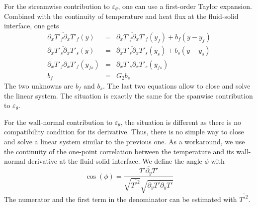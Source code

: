 \documentclass{svjour3}                     %
\begin{document}
For the streamwise contribution to $\varepsilon_\theta$, one can use a first-order Taylor expansion.
Combined with the continuity of temperature and heat flux at the fluid-solid interface, one gets
\begin{eqnarray}
\overline{\partial_x T'_f \partial_x T'_f} \left( y \right) & = & \overline{\partial_x T'_f \partial_x T'_f} \left( y_f \right) + b_f \left( y-y_f \right) \nonumber \\
\overline{\partial_x T'_s \partial_x T'_s} \left( y \right) & = & \overline{\partial_x  T'_s \partial_x T'_s} \left( y_s \right) + b_s \left( y-y_s \right) \nonumber \\
\overline{\partial_x T'_f \partial_x T'_f} \left( y_{fs} \right) & = & \overline{\partial_x T'_s \partial_x T'_s} \left( y_{fs} \right) \nonumber \\
b_f & = & G_2 b_s
\end{eqnarray}
The two unknowns are $b_f$ and $b_s$.
The last two equations allow to close and solve the linear system.
The situation is exactly the same for the spanwise contribution to $\varepsilon_\theta$.

For the wall-normal contribution to $\varepsilon_\theta$, the situation is different as there is no compatibility condition for its derivative.
Thus, there is no simple way to close and solve a linear system similar to the previous one.
As a workaround, we use the continuity of the one-point correlation between the temperature and its wall-normal derivative at the fluid-solid interface.
We define the angle $\phi$ with
\begin{equation}
\cos \left( \phi \right) = \frac{\overline{T' \partial_y T'}}{\sqrt{\overline{{T'}^2}}\sqrt{\overline{\partial_y T' \partial_y T'}}}
\end{equation}
The numerator and the first term in the denominator can be estimated with $\overline{{T'}^2}$.
\end{document}
